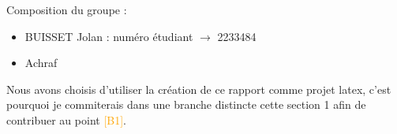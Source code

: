 Composition du groupe :
\begin{itemize}
    \item BUISSET Jolan : numéro étudiant $\rightarrow$ 2233484
    \item Achraf
\end{itemize}
Nous avons choisis d'utiliser la création de ce rapport comme projet latex, c'est pourquoi je commiterais dans une branche distincte cette section 1 afin de contribuer au point \textcolor{orange}{[B1]}.
